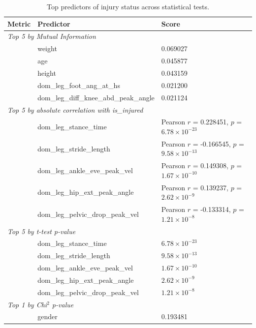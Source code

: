 \begin{table}[htbp]
    \centering
    \caption{Top predictors of injury status across statistical tests. \label{tab:met-top-vars-stat-test}}
    \begin{tabular}{lll}
        \hline
        \textbf{Metric} & \textbf{Predictor} & \textbf{Score} \\
        \hline
        \multicolumn{3}{l}{\textit{Top 5 by Mutual Information}} \\
        & weight & 0.069027 \\
        & age & 0.045877 \\
        & height & 0.043159 \\
        & dom\_leg\_foot\_ang\_at\_hs & 0.021200 \\
        & dom\_leg\_diff\_knee\_abd\_peak\_angle & 0.021124 \\
        \hline
        \multicolumn{3}{l}{\textit{Top 5 by absolute correlation with is\_injured}} \\
        & dom\_leg\_stance\_time & Pearson $r$ = 0.228451, $p$ = $6.78 \times 10^{-23}$ \\
        & dom\_leg\_stride\_length & Pearson $r$ = -0.166545, $p$ = $9.58 \times 10^{-13}$ \\
        & dom\_leg\_ankle\_eve\_peak\_vel & Pearson $r$ = 0.149308, $p$ = $1.67 \times 10^{-10}$ \\
        & dom\_leg\_hip\_ext\_peak\_angle & Pearson $r$ = 0.139237, $p$ = $2.62 \times 10^{-9}$ \\
        & dom\_leg\_pelvic\_drop\_peak\_vel & Pearson $r$ = -0.133314, $p$ = $1.21 \times 10^{-8}$ \\
        \hline
        \multicolumn{3}{l}{\textit{Top 5 by t-test p-value}} \\
        & dom\_leg\_stance\_time & $6.78 \times 10^{-23}$ \\
        & dom\_leg\_stride\_length & $9.58 \times 10^{-13}$ \\
        & dom\_leg\_ankle\_eve\_peak\_vel & $1.67 \times 10^{-10}$ \\
        & dom\_leg\_hip\_ext\_peak\_angle & $2.62 \times 10^{-9}$ \\
        & dom\_leg\_pelvic\_drop\_peak\_vel & $1.21 \times 10^{-8}$ \\
        \hline
        \multicolumn{3}{l}{\textit{Top 1 by Chi$^2$ p-value}} \\
        & gender & 0.193481 \\
        \hline
    \end{tabular}
\end{table}

